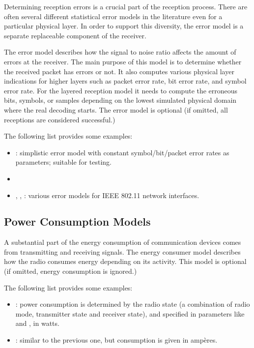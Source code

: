 Determining reception errors is a crucial part of the reception process.
There are often several different statistical error models in the literature
even for a particular physical layer. In order to support this diversity, the
error model is a separate replaceable component of the receiver. 

The error model describes how the signal to noise ratio affects the amount of
errors at the receiver. The main purpose of this model is to determine whether
the received packet has errors or not. It also computes various physical
layer indications for higher layers such as packet error rate, bit error rate,
and symbol error rate. For the layered reception model it needs to compute the
erroneous bits, symbols, or samples depending on the lowest simulated physical
domain where the real decoding starts. The error model is optional (if omitted,
all receptions are considered successful.)

The following list provides some examples:

\begin{itemize}
  \item {}: simplistic error model with constant
    symbol/bit/packet error rates as parameters; suitable for testing. 
  \item {} 
  \item {}, , 
    : various error models for IEEE 802.11
    network interfaces.
\end{itemize}

\subsection{Power Consumption Models}

A substantial part of the energy consumption of communication devices comes from
transmitting and receiving signals. The energy consumer model describes how the
radio consumes energy depending on its activity. This model is optional (if
omitted, energy consumption is ignored.) 

The following list provides some examples:

\begin{itemize}
  \item {}: power consumption is
    determined by the radio state (a combination of radio mode, 
    transmitter state and receiver state), and specified in 
    parameters like  and 
    , in watts.
  \item {}: similar to the previous
    one, but consumption is given in amp\`eres.
\end{itemize}


